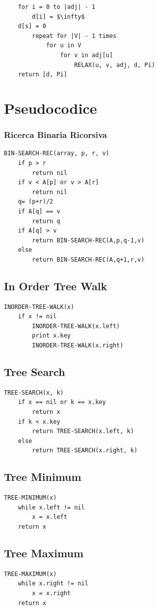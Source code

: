 \documentclass[10pt,a4paper]{article}
\begin{document}
\begin{multicols*}{2}
\begin{lstlisting}
    for i = 0 to |adj| - 1
        d[i] = $\infty$
    d[s] = 0
        repeat for |V| - 1 times
            for u in V
                for v in adj[u]
                    RELAX(u, v, adj, d, Pi)
    return [d, Pi]
\end{lstlisting}

\section*{Pseudocodice}

\subsubsection*{Ricerca Binaria Ricorsiva}
\begin{lstlisting}
BIN-SEARCH-REC(array, p, r, v)
    if p > r
        return nil
    if v < A[p] or v > A[r]
        return nil
    q= (p+r)/2
    if A[q] == v
        return q
    if A[q] > v
        return BIN-SEARCH-REC(A,p,q-1,v)
    else
        return BIN-SEARCH-REC(A,q+1,r,v)
\end{lstlisting}

\subsection*{In Order Tree Walk}
\begin{lstlisting}
INORDER-TREE-WALK(x)
    if x != nil
        INORDER-TREE-WALK(x.left)
        print x.key
        INORDER-TREE-WALK(x.right)
\end{lstlisting}
\subsection*{Tree Search}
\begin{lstlisting}
TREE-SEARCH(x, k)
    if x == nil or k == x.key
        return x
    if k < x.key
        return TREE-SEARCH(x.left, k)
    else
        return TREE-SEARCH(x.right, k)
\end{lstlisting}
\subsection*{Tree Minimum}
\begin{lstlisting}
TREE-MINIMUM(x)
    while x.left != nil
        x = x.left
    return x
\end{lstlisting}

\columnbreak

\subsection*{Tree Maximum}
\begin{lstlisting}
TREE-MAXIMUM(x)
    while x.right != nil
        x = x.right
    return x
\end{lstlisting}

\end{multicols*}
\end{document}
